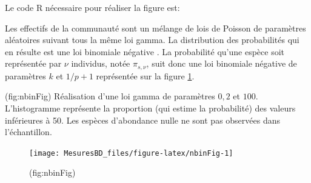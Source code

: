 \documentclass[
  11pt,
  french,
  a4paper,
  extrafontsizes,onecolumn,openright
  ]{memoir}
\newenvironment{Shaded}{\begin{snugshade}}{\end{snugshade}}
\newcommand{\DataTypeTok}[1]{\textcolor[rgb]{0.13,0.29,0.53}{#1}}
\newcommand{\DecValTok}[1]{\textcolor[rgb]{0.00,0.00,0.81}{#1}}
\newcommand{\FloatTok}[1]{\textcolor[rgb]{0.00,0.00,0.81}{#1}}
\newcommand{\KeywordTok}[1]{\textcolor[rgb]{0.13,0.29,0.53}{\textbf{#1}}}
\newcommand{\NormalTok}[1]{#1}
\newcommand{\OperatorTok}[1]{\textcolor[rgb]{0.81,0.36,0.00}{\textbf{#1}}}
\newcommand{\StringTok}[1]{\textcolor[rgb]{0.31,0.60,0.02}{#1}}
\begin{document}
\normalsize

Le code R nécessaire pour réaliser la figure est:

\scriptsize

\begin{Shaded}
\end{Shaded}

\normalsize

Les effectifs de la communauté sont un mélange de lois de Poisson de paramètres aléatoires suivant tous la même loi gamma.
La distribution des probabilités qui en résulte est une loi binomiale négative \autocite{Greenwood1920}.
La probabilité qu'une espèce soit représentée par \(\nu\) individus, notée \({\pi}_{s,\nu}\), suit donc une loi binomiale négative de paramètres \(k\) et \({1}/{p+1}\) représentée sur la figure \ref{fig:nbinFig}.

(fig:nbinFig) Réalisation d'une loi gamma de paramètres \(0,2\) et \(100\). L'histogramme représente la proportion (qui estime la probabilité) des valeurs inférieures à 50. Les espèces d'abondance nulle ne sont pas observées dans l'échantillon.

\scriptsize

\begin{figure}

{\centering \texttt{[image: MesuresBD\_files/figure-latex/nbinFig-1]} 

}

\caption{(fig:nbinFig)}\label{fig:nbinFig}
\end{figure}
\end{document}
